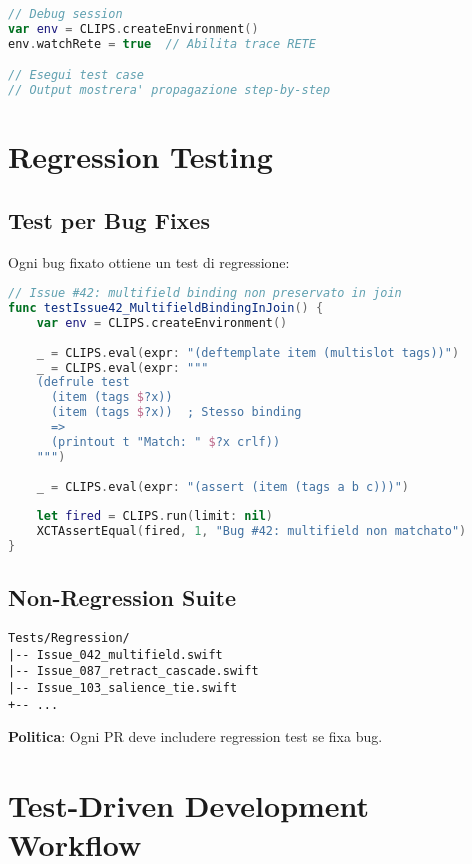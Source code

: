 \begin{lstlisting}[language=Swift]
// Debug session
var env = CLIPS.createEnvironment()
env.watchRete = true  // Abilita trace RETE

// Esegui test case
// Output mostrera' propagazione step-by-step
\end{lstlisting}

\section{Regression Testing}

\subsection{Test per Bug Fixes}

Ogni bug fixato ottiene un test di regressione:

\begin{lstlisting}[language=Swift]
// Issue #42: multifield binding non preservato in join
func testIssue42_MultifieldBindingInJoin() {
    var env = CLIPS.createEnvironment()
    
    _ = CLIPS.eval(expr: "(deftemplate item (multislot tags))")
    _ = CLIPS.eval(expr: """
    (defrule test
      (item (tags $?x))
      (item (tags $?x))  ; Stesso binding
      =>
      (printout t "Match: " $?x crlf))
    """)
    
    _ = CLIPS.eval(expr: "(assert (item (tags a b c)))")
    
    let fired = CLIPS.run(limit: nil)
    XCTAssertEqual(fired, 1, "Bug #42: multifield non matchato")
}
\end{lstlisting}

\subsection{Non-Regression Suite}

\begin{verbatim}
Tests/Regression/
|-- Issue_042_multifield.swift
|-- Issue_087_retract_cascade.swift
|-- Issue_103_salience_tie.swift
+-- ...
\end{verbatim}

\textbf{Politica}: Ogni PR deve includere regression test se fixa bug.

\section{Test-Driven Development Workflow}

